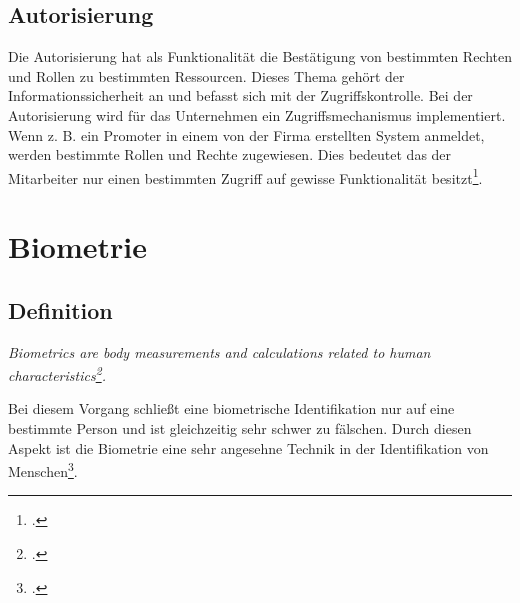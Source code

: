 \subsection{Autorisierung}
Die Autorisierung hat als Funktionalität die Bestätigung von bestimmten Rechten und Rollen zu bestimmten Ressourcen. Dieses Thema gehört der Informationssicherheit an und befasst sich mit der Zugriffskontrolle. Bei der Autorisierung wird für das Unternehmen ein Zugriffsmechanismus implementiert. Wenn z. B. ein Promoter in einem von der Firma erstellten System anmeldet, werden bestimmte Rollen und Rechte zugewiesen. Dies bedeutet das der Mitarbeiter nur einen bestimmten Zugriff auf gewisse Funktionalität besitzt\footcite{anmeldevorgangs}.



\section{Biometrie}
\subsection{Definition}
\begin{center}
	\textit{Biometrics are body measurements and calculations related to human characteristics\footcite{biometrie}.}
\end{center}

Bei diesem Vorgang schließt eine biometrische Identifikation nur auf eine bestimmte Person und ist gleichzeitig sehr schwer zu fälschen.
Durch diesen Aspekt ist die Biometrie eine sehr angesehne Technik in der Identifikation von Menschen\footcite{biometrie}.

